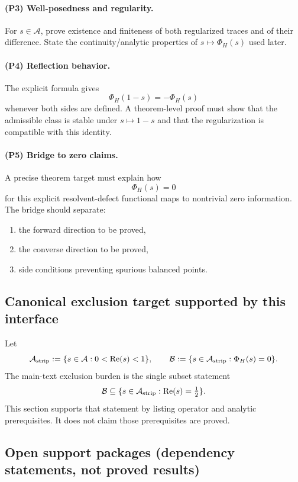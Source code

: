 \paragraph{(P3) Well-posedness and regularity.}
For $s\in\mathcal{A}$, prove existence and finiteness of both regularized traces and of their difference.
State the continuity/analytic properties of $s\mapsto\Phi_H(s)$ used later.

\paragraph{(P4) Reflection behavior.}
The explicit formula gives
\[
\Phi_H(1-s)=-\Phi_H(s)
\]
whenever both sides are defined.
A theorem-level proof must show that the admissible class is stable under $s\mapsto 1-s$ and that the regularization is compatible with this identity.

\paragraph{(P5) Bridge to zero claims.}
A precise theorem target must explain how
\[
\Phi_H(s)=0
\]
for this explicit resolvent-defect functional maps to nontrivial zero information.
The bridge should separate:
\begin{enumerate}
  \item the forward direction to be proved,
  \item the converse direction to be proved,
  \item side conditions preventing spurious balanced points.
\end{enumerate}

\subsection*{Canonical exclusion target supported by this interface}
Let
\[
\mathcal{A}_{\mathrm{strip}}:=\{s\in\mathcal{A}:0<\operatorname{Re}(s)<1\},
\qquad
\mathcal{B}:=\{s\in\mathcal{A}_{\mathrm{strip}}:\Phi_H(s)=0\}.
\]
The main-text exclusion burden is the single subset statement
\[
\mathcal{B}\subseteq\{s\in\mathcal{A}_{\mathrm{strip}}:\operatorname{Re}(s)=\tfrac12\}.
\]
This section supports that statement by listing operator and analytic prerequisites.
It does not claim those prerequisites are proved.

\subsection*{Open support packages (dependency statements, not proved results)}
